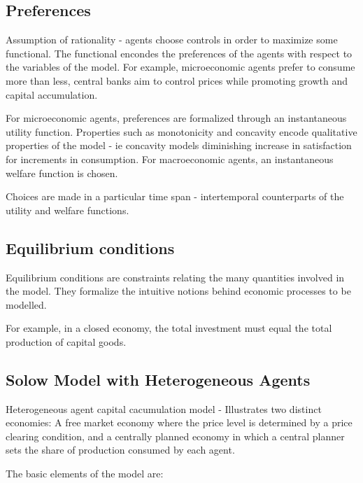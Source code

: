 \documentclass{article}
\begin{document}
\subsection{Preferences}

Assumption of rationality - agents choose controls in order to maximize some functional. The functional 
encondes the preferences of the agents with respect to the variables of the model.
For example, microeconomic agents prefer to consume more than less, central banks aim to control prices
while promoting growth and capital accumulation.

For microeconomic agents, preferences are formalized through an instantaneous utility function.
Properties such as monotonicity and concavity encode qualitative properties of the model -
ie concavity models diminishing increase in satisfaction for increments in consumption.
For macroeconomic agents, an instantaneous welfare function is chosen.

Choices are made in a particular time span - intertemporal counterparts of the utility and welfare
functions.

\subsection{Equilibrium conditions}

Equilibrium conditions are constraints relating the many quantities involved in the model. 
They formalize the intuitive notions behind economic processes to be modelled.

For example, in a closed economy, the total investment must equal the total production of capital goods.

\subsection{Solow Model with Heterogeneous Agents}

Heterogeneous agent capital cacumulation model - Illustrates two distinct economies:
A free market economy where the price level is determined by a price clearing condition,
and a centrally planned economy in which a central planner sets the share of production consumed
by each agent.

The basic elements of the model are:
\end{document}
